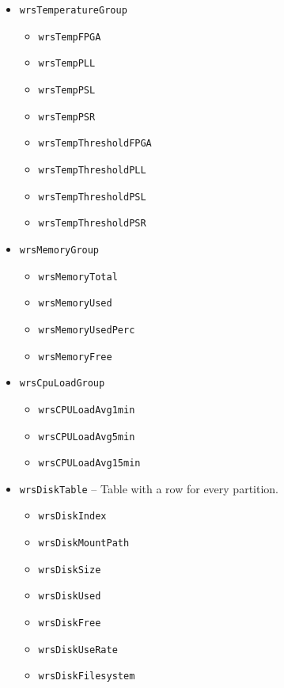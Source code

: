 \begin{itemize}
\begin{itemize}
\begin{itemize}
	\end{itemize}
      \item \texttt{wrsTemperatureGroup}
	\begin{itemize}
	  \item \texttt{wrsTempFPGA}
	  \item \texttt{wrsTempPLL}
	  \item \texttt{wrsTempPSL}
	  \item \texttt{wrsTempPSR}
	  \item \texttt{wrsTempThresholdFPGA}
	  \item \texttt{wrsTempThresholdPLL}
	  \item \texttt{wrsTempThresholdPSL}
	  \item \texttt{wrsTempThresholdPSR}
	\end{itemize}
      \item \texttt{wrsMemoryGroup}
	\begin{itemize}
	  \item \texttt{wrsMemoryTotal}
	  \item \texttt{wrsMemoryUsed}
	  \item \texttt{wrsMemoryUsedPerc}
	  \item \texttt{wrsMemoryFree}
	\end{itemize}
      \item \texttt{wrsCpuLoadGroup}
	\begin{itemize}
	  \item \texttt{wrsCPULoadAvg1min}
	  \item \texttt{wrsCPULoadAvg5min}
	  \item \texttt{wrsCPULoadAvg15min}
	\end{itemize}
      \item \texttt{wrsDiskTable} -- Table with a row for every partition.
	\begin{itemize}
	  \item \texttt{wrsDiskIndex}
	  \item \texttt{wrsDiskMountPath}
	  \item \texttt{wrsDiskSize}
	  \item \texttt{wrsDiskUsed}
	  \item \texttt{wrsDiskFree}
	  \item \texttt{wrsDiskUseRate}
	  \item \texttt{wrsDiskFilesystem}
	\end{itemize}
    \end{itemize}


\end{itemize}
